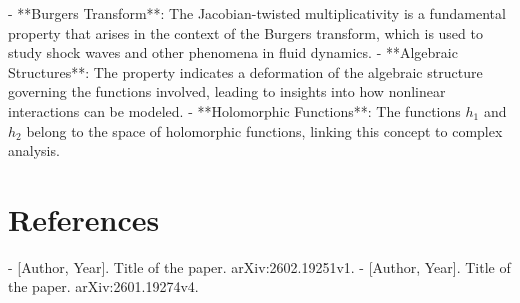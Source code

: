 \documentclass[11pt,a4paper]{article}
\begin{document}
- **Burgers Transform**: The Jacobian-twisted multiplicativity is a fundamental property that arises in the context of the Burgers transform, which is used to study shock waves and other phenomena in fluid dynamics.
- **Algebraic Structures**: The property indicates a deformation of the algebraic structure governing the functions involved, leading to insights into how nonlinear interactions can be modeled.
- **Holomorphic Functions**: The functions $h_1$ and $h_2$ belong to the space of holomorphic functions, linking this concept to complex analysis.

\section{References}
- [Author, Year]. Title of the paper. arXiv:2602.19251v1.
- [Author, Year]. Title of the paper. arXiv:2601.19274v4.
\end{document}
